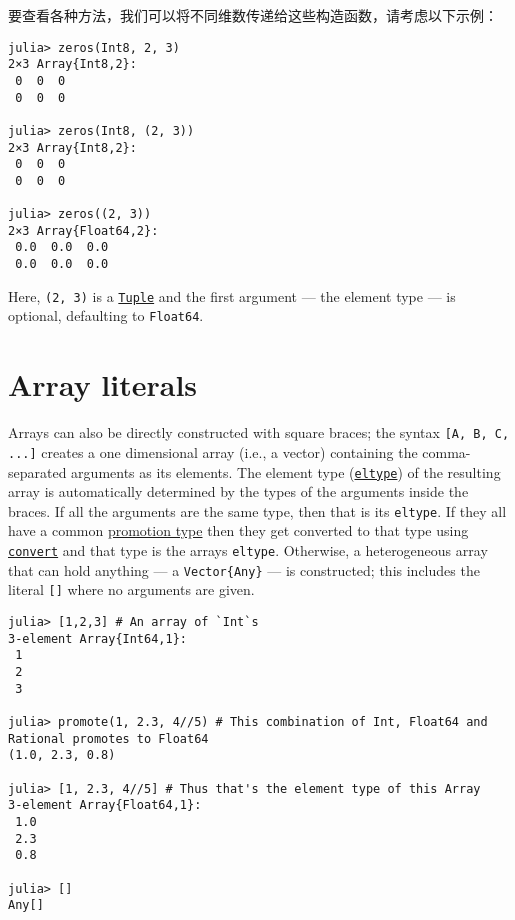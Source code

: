 

要查看各种方法，我们可以将不同维数传递给这些构造函数，请考虑以下示例：




\begin{verbatim}
julia> zeros(Int8, 2, 3)
2×3 Array{Int8,2}:
 0  0  0
 0  0  0

julia> zeros(Int8, (2, 3))
2×3 Array{Int8,2}:
 0  0  0
 0  0  0

julia> zeros((2, 3))
2×3 Array{Float64,2}:
 0.0  0.0  0.0
 0.0  0.0  0.0
\end{verbatim}



Here, \texttt{(2, 3)} is a \hyperlink{17462354060312563026}{\texttt{Tuple}} and the first argument — the element type — is optional, defaulting to \texttt{Float64}.



\hypertarget{15443953423472878802}{}


\section{Array literals}



Arrays can also be directly constructed with square braces; the syntax \texttt{[A, B, C, ...]} creates a one dimensional array (i.e., a vector) containing the comma-separated arguments as its elements. The element type (\hyperlink{6396209842929672718}{\texttt{eltype}}) of the resulting array is automatically determined by the types of the arguments inside the braces. If all the arguments are the same type, then that is its \texttt{eltype}. If they all have a common \hyperlink{10374023657104680331}{promotion type} then they get converted to that type using \hyperlink{1846942650946171605}{\texttt{convert}} and that type is the array{\textquotesingle}s \texttt{eltype}. Otherwise, a heterogeneous array that can hold anything — a \texttt{Vector\{Any\}} — is constructed; this includes the literal \texttt{[]} where no arguments are given.




\begin{verbatim}
julia> [1,2,3] # An array of `Int`s
3-element Array{Int64,1}:
 1
 2
 3

julia> promote(1, 2.3, 4//5) # This combination of Int, Float64 and Rational promotes to Float64
(1.0, 2.3, 0.8)

julia> [1, 2.3, 4//5] # Thus that's the element type of this Array
3-element Array{Float64,1}:
 1.0
 2.3
 0.8

julia> []
Any[]
\end{verbatim}



